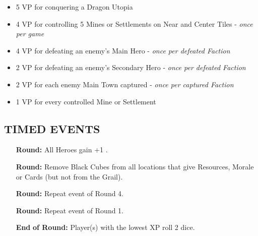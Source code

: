 \begin{multicols*}{2}
\begin{itemize}
 \item 5 VP for conquering a Dragon Utopia
 \item 4 VP for controlling 5 Mines or Settlements on Near and Center Tiles - \textit{once per game}
 \item 4 VP for defeating an enemy's Main Hero - \textit{once per defeated Faction}
 \item 2 VP for defeating an enemy's Secondary Hero - \textit{once per defeated Faction}
 \item 2 VP for each enemy Main Town captured - \textit{once per captured Faction}
 \item 1 VP for every controlled Mine or Settlement
\end{itemize}

\subsection*{\MakeUppercase{Timed Events}}

\begin{itemize}
  \item[\textbf{\nth{1}}] \textbf{Round:} All Heroes gain +1 .
  \item[\textbf{\nth{4}}] \textbf{Round:} Remove Black Cubes from all locations that give Resources, Morale or Cards (but not from the Grail).
  \item[\textbf{\nth{8}}] \textbf{Round:} Repeat event of Round 4.
  \item[\textbf{\nth{9}}] \textbf{Round:} Repeat event of Round 1.
  \item[\textbf{End}] \textbf{of  Round:} Player(s) with the lowest XP roll 2  dice.
\end{itemize}


\end{multicols*}
